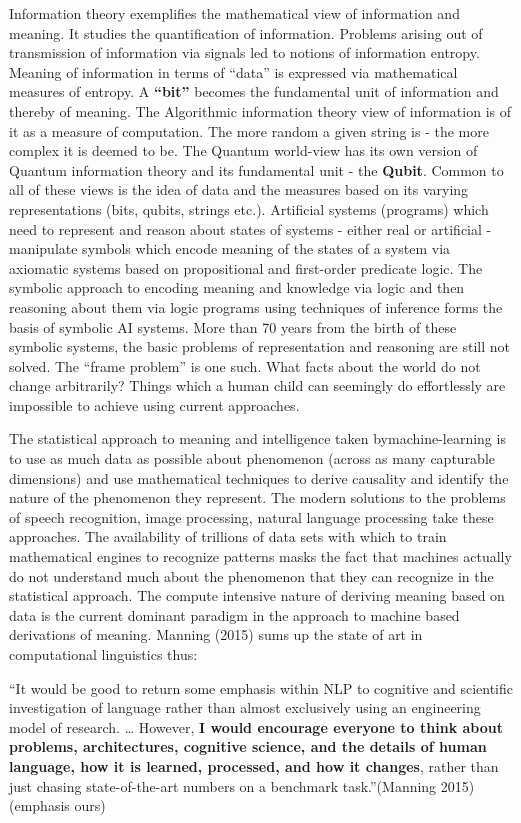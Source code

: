 Information theory exemplifies the mathematical view of information and meaning. It studies the quantification of information. Problems arising out of transmission of information via signals led to notions of information entropy. Meaning of information in terms of “data” is expressed via mathematical measures of entropy. A \textbf{“bit”} becomes the fundamental unit of information and thereby of meaning. The Algorithmic information theory view of information is of it as a measure of computation. The more random a given string is - the more complex it is deemed to be. The Quantum world-view has its own version of Quantum information theory and its fundamental unit - the \textbf{Qubit}. Common to all of these views is the idea of data and the measures based on its varying representations (bits, qubits, strings etc.). Artificial systems (programs) which need to represent and reason about states of systems - either real or artificial - manipulate symbols which encode meaning of the states of a system via axiomatic systems based on propositional and first-order predicate logic. The symbolic approach to encoding meaning and knowledge via logic and then reasoning about them via logic programs using techniques of inference forms the basis of symbolic AI systems. More than 70 years from the birth of these symbolic systems, the basic problems of representation and reasoning are still not solved. The “frame problem” is one such. What facts about the world do not change arbitrarily? Things which a human child can seemingly do effortlessly are impossible to achieve using current approaches.

The statistical approach to meaning and intelligence taken by\break machine-learning is to use as much data as possible about phenomenon (across as many capturable dimensions) and use mathematical techniques to derive causality and identify the nature of the phenomenon they represent. The modern solutions to the problems of speech recognition, image processing, natural language processing take these approaches. The availability of trillions of data sets with which to train mathematical engines to recognize patterns masks the fact that machines actually do not understand much about the phenomenon that they can recognize in the statistical approach. The compute intensive nature of deriving meaning based on data is the current dominant paradigm in the approach to machine based derivations of meaning. Manning (2015) sums up the state of art in computational linguistics thus:

\begin{myquote}
“It would be good to return some emphasis within NLP to cognitive and scientific investigation of language rather than almost exclusively using an engineering model of research. … However, \textbf{I would encourage everyone to think about problems, architectures, cognitive science, and the details of human language, how it is learned, processed, and how it changes}, rather than just chasing state-of-the-art numbers on a benchmark task.”\hfill (Manning 2015) (emphasis ours)
\end{myquote}

